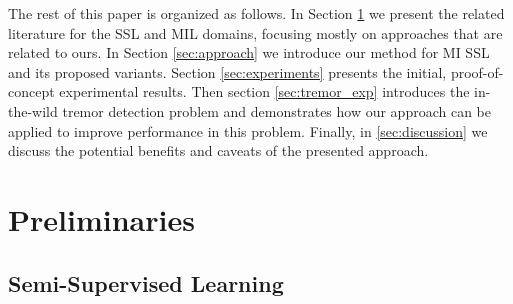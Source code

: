 \documentclass[journal,twoside,web]{ieeecolor}
\begin{document}
The rest of this paper is organized as follows. In Section \ref{sec:prelim} we
present the related literature for the SSL and MIL domains, focusing mostly on
approaches that are related to ours. In Section \ref{sec:approach} we
introduce our method for MI SSL and its proposed variants. Section
\ref{sec:experiments} presents the initial, proof-of-concept experimental
results. Then section \ref{sec:tremor_exp}
introduces the in-the-wild tremor detection problem and demonstrates how our
approach can be applied to improve performance in this problem. Finally, in
\ref{sec:discussion} we discuss the potential benefits and caveats of the
presented approach.%

\section{Preliminaries}

\label{sec:prelim}

\subsection{Semi-Supervised Learning}
\end{document}
